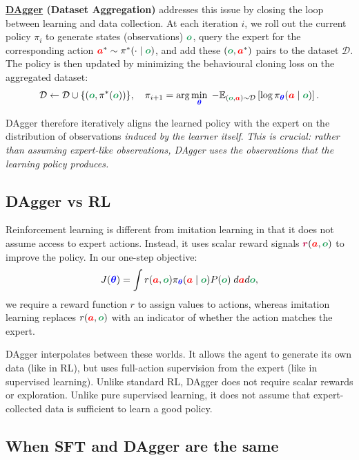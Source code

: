 \documentclass{article}
\newcommand{\colsym}[2]{\ensuremath{\textcolor{#1}{\boldsymbol{#2}}}}
\newcommand{\action}{\colsym{red}{a}}
\newcommand{\obs}{\colsym{ForestGreen}{o}}
\newcommand{\reward}{\colsym{purple}{r}}
\newcommand{\params}{\colsym{blue}{\theta}}
\begin{document}
\vspace{0.5em}
\noindent
\textbf{\href{https://www.ri.cmu.edu/pub_files/2015/3/InvitationToImitation_3_1415.pdf}{DAgger} (Dataset Aggregation)} addresses this issue by closing the loop between learning and data collection. At each iteration $i$, we roll out the current policy $\pi_i$ to generate states (observations) $\obs$, query the expert for the corresponding action $\action^* \sim \pi^*(\cdot \mid \obs)$, and add these $(\obs, \action^*)$ pairs to the dataset $\mathcal{D}$. The policy is then updated by minimizing the behavioural cloning loss on the aggregated dataset:
\[
    \mathcal{D} \leftarrow \mathcal{D} \cup \{ (\obs, \pi^*(\obs)) \}, \quad
    \pi_{i+1} = \arg\min_{\params} \; -\mathbb{E}_{(\obs,\action) \sim \mathcal{D}} \left[ \log \pi_{\params}(\action \mid \obs) \right].
\]

DAgger therefore iteratively aligns the learned policy with the expert on the distribution of observations \emph{induced by the learner itself}. \emph{This is crucial: rather than assuming expert-like observations, DAgger uses the observations that the learning policy produces.}

\subsection{DAgger vs RL}

Reinforcement learning is different from imitation learning in that it does not assume access to expert actions. Instead, it uses scalar reward signals $\reward(\action, \obs)$ to improve the policy. In our one-step objective:
\[
J(\params) = \int r(\action, \obs) \pi_{\params}(\action \mid \obs) P(\obs) \; d\action d\obs,
\]
we require a reward function $r$ to assign values to actions, whereas imitation learning replaces $r(\action, \obs)$ with an indicator of whether the action matches the expert.

DAgger interpolates between these worlds. It allows the agent to generate its own data (like in RL), but uses full-action supervision from the expert (like in supervised learning). Unlike standard RL, DAgger does not require scalar rewards or exploration. Unlike pure supervised learning, it does not assume that expert-collected data is sufficient to learn a good policy.

\subsection{When SFT and DAgger are the same}
\end{document}
